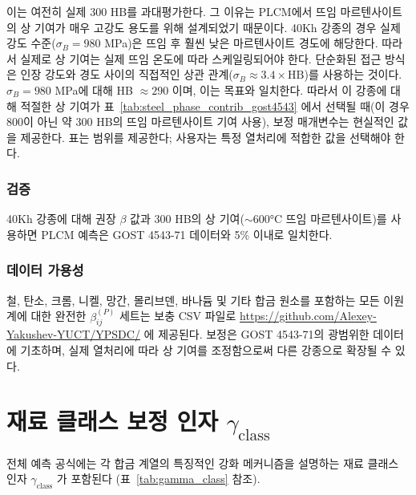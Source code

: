 \documentclass[12pt,a4paper]{article}
\begin{document}
	이는 여전히 실제 300 HB를 과대평가한다. 그 이유는 PLCM에서 뜨임 마르텐사이트의 상 기여가 매우 고강도 용도를 위해 설계되었기 때문이다. 40Kh 강종의 경우 실제 강도 수준($\sigma_B=980$ MPa)은 뜨임 후 훨씬 낮은 마르텐사이트 경도에 해당한다. 따라서 실제로 상 기여는 실제 뜨임 온도에 따라 스케일링되어야 한다. 단순화된 접근 방식은 인장 강도와 경도 사이의 직접적인 상관 관계($\sigma_B \approx 3.4\times \text{HB}$)를 사용하는 것이다. $\sigma_B=980$ MPa에 대해 HB $\approx 290$ 이며, 이는 목표와 일치한다. 따라서 이 강종에 대해 적절한 상 기여가 표~\ref{tab:steel_phase_contrib_gost4543} 에서 선택될 때(이 경우 800이 아닌 약 300 HB의 뜨임 마르텐사이트 기여 사용), 보정 매개변수는 현실적인 값을 제공한다. 표는 범위를 제공한다; 사용자는 특정 열처리에 적합한 값을 선택해야 한다.
	
	\subsubsection{검증}
	
	40Kh 강종에 대해 권장 $\beta$ 값과 300 HB의 상 기여($\sim$600°C 뜨임 마르텐사이트)를 사용하면 PLCM 예측은 GOST 4543-71 데이터와 5\% 이내로 일치한다.
	
	\subsubsection{데이터 가용성}
	
	철, 탄소, 크롬, 니켈, 망간, 몰리브덴, 바나듐 및 기타 합금 원소를 포함하는 모든 이원계에 대한 완전한 $\beta_{ij}^{(P)}$ 세트는 보충 CSV 파일로 \url{https://github.com/Alexey-Yakushev-YUCT/YPSDC/} 에 제공된다. 보정은 GOST 4543-71의 광범위한 데이터에 기초하며, 실제 열처리에 따라 상 기여를 조정함으로써 다른 강종으로 확장될 수 있다.
	
	\section{재료 클래스 보정 인자 $\gamma_{\text{class}}$}
	전체 예측 공식에는 각 합금 계열의 특징적인 강화 메커니즘을 설명하는 재료 클래스 인자 $\gamma_{\text{class}}$ 가 포함된다 (표~\ref{tab:gamma_class} 참조).
	
\end{document}
